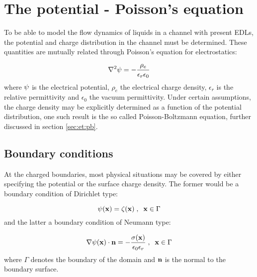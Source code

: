 \section{The potential - Poisson's equation}\label{sec:et:poisson}
To be able to model the flow dynamics of liquids in a channel with
present EDLs, the potential and charge distribution
in the channel must be determined. These quantities are mutually
related through Poisson's equation for electrostatics:

\begin{equation}\label{eq:pb}
\nabla^2\mathrm{\psi} = -\frac{\rho_e}{\epsilon_r \epsilon_0}
\end{equation}
where $\mathrm{\psi}$ is the electrical potential, $\rho_e$ the electrical
charge density, $\epsilon_r$ is the relative permittivity and
$\epsilon_0$ the vacuum permittivity. Under certain assumptions, the
charge density may be explicitly determined as a function of the
potential distribution, one such result is the so called
Poisson-Boltzmann equation, further discussed in section \ref{sec:et:pb}.

\subsection{Boundary conditions}
At the charged boundaries, most physical situations may be covered by
either specifying the potential or the surface charge density. The
former would be a boundary condition of Dirichlet type:

\begin{equation}
\mathrm{\psi}(\mathbf{x}) = \zeta(\mathbf{x})\;,\;\; \mathbf{x} \in \Gamma
\end{equation}
and the latter a boundary condition of Neumann type:

\begin{equation}
\nabla\mathrm{\psi}(\mathbf{x}) \cdot \mathbf{n} =
-\frac{\sigma(\mathbf{x})}{\epsilon_0\epsilon_r}\;,\;\; \mathbf{x} \in \Gamma
\end{equation}
where $\Gamma$ denotes the boundary of the domain and $\mathbf{n}$ is the
normal to the boundary surface.\- \cite{hlushkou}
